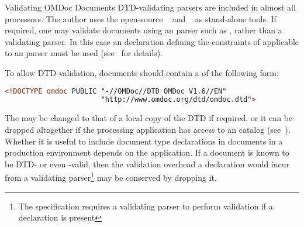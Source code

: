 \begin{module}[id=validating]
\begin{omgroup}[id=validating]{Validating OMDoc Documents}
  DTD-validating {\xml} parsers are included in almost all {\xml} processors. The author
  uses the open-source {\rxp}~\cite{Tobin:RXP} and
  {}~\cite{Veillard:libxml2} as stand-alone tools. If required, one may
  validate {\omdoc} documents using an {\sgml} parser such as {\nsgmls}, rather than a
  validating {\xml} parser. In this case an {\sgml} declaration defining the constraints
  of {\xml} applicable to an {\sgml} parser must be used (see~\cite{Clark:csx97} for
  details).

  To allow DTD-validation, {\omdoc} documents should contain a {} of the following form:
\begin{center}
\begin{lstlisting}[language=XML,index={DOCTYPE,omdoc}]
<!DOCTYPE omdoc PUBLIC "-//OMDoc//DTD OMDoc V1.6//EN"
                       "http://www.omdoc.org/dtd/omdoc.dtd">
\end{lstlisting}
\end{center}
The {} may be changed to that of a local copy of the DTD if required, or it
can be dropped altogether if the processing application has access to an {\xml}
catalog (see~).  Whether it is useful to include
document type declarations in documents in a production environment depends on the
application. If a document is known to be DTD- or even {\omdoc}-valid, then the validation
overhead a {} declaration would incur from a validating
parser\footnote{The {\xml} specification requires a validating parser to perform
  validation if a {} declaration is present} may be conserved by
dropping it.



\end{omgroup}
\end{module}
